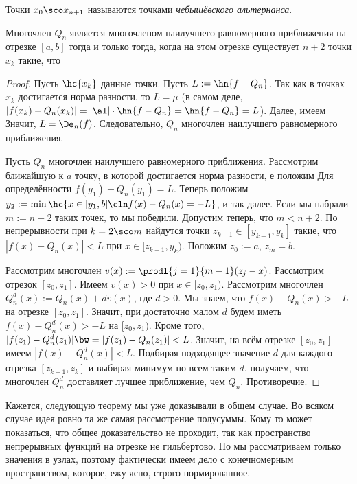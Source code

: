 \documentclass[a4paper]{article}
\begin{document}
\begin{df}
Точки $x_0\sco x_{n+1}$ называются точками \emph{чебышёвского
  альтернанса}.
\end{df}

\begin{theorem}[Чебышёв]
Многочлен $Q_n$ является многочленом наилучшего равномерного
приближения на отрезке $[a,b]$ тогда и только тогда, когда на этом
отрезке существует $n+2$ точки $x_k$ такие, что 
\end{theorem}
\begin{proof}

\framebox{$\Lar$} Пусть $\hc{x_k}$ данные точки. Пусть $L :=
\hn{f-Q_n}$. Так как в точках $x_k$ достигается норма разности, то $L
= \mu$ (в самом деле, $|f(x_k) -Q_n(x_k)| = |\al| \cdot \hn{f-Q_n} =
\hn{f-Q_n} = L$).  Далее, имеем   Значит, $L = \De_n(f)$. Следовательно, $Q_n$
многочлен наилучшего равномерного приближения.

\framebox{$\Ra$} Пусть $Q_n$ многочлен наилучшего равномерного
приближения. Рассмотрим ближайшую к $a$ точку, в которой достигается
норма разности, е положим  Для определённости $f(y_1)-Q_n(y_1) =
L$. Теперь положим $y_2 := \min\hc{x\in [y_1,b]\cln f(x)-Q_n(x) =-L}$,
и так далее. Если мы набрали $m := n+2$ таких точек, то мы победили.
Допустим теперь, что $m < n+2$. По непрерывности при $k=2\sco m$
найдутся точки $z_{k-1} \in [y_{k-1},y_k]$ такие, что $|f(x)-Q_n(x)| <
L$ при $x\in [z_{k-1},y_k)$. Положим $z_0 := a$, $z_m = b$.

Рассмотрим многочлен $v(x) := \prodl{j=1}{m-1}(z_j-x)$. Рассмотрим
отрезок $[z_0,z_1]$. Имеем $v(x) > 0$ при $x\in [z_0,z_1)$.
  Рассмотрим многочлен $Q_n^d(x) := Q_n(x)+d v(x)$, где $d > 0$. Мы
  знаем, что $f(x)-Q_n(x) > -L$ на отрезке $[z_0,z_1]$.  Значит, при
  достаточно малом $d$ будем иметь $f(x)-Q_n^d(x) > -L$ на
  $[z_0,z_1)$. Кроме того, $|f(z_1)-Q_n^d(z_1)| \bw= |f(z_1)-Q_n(z_1)|
    <L$. Значит, на всём отрезке $[z_0,z_1]$ имеем $|f(x)-Q_n^d(x)| <
    L$.  Подбирая подходящее значение $d$ для каждого отрезка
    $[z_{k-1},z_k]$ и выбирая минимум по всем таким $d$, получаем, что
    многочлен $Q_n^d$ доставляет лучшее приближение, чем
    $Q_n$. Противоречие.
\end{proof}

\begin{petit}
Кажется, следующую теорему мы уже доказывали в общем случае. Во всяком
случае идея ровно та же самая рассмотрение полусуммы.  Кому то может
показаться, что общее доказательство не проходит, так как пространство
непрерывных функций на отрезке не гильбертово.  Но мы рассматриваем
только значения в узлах, поэтому фактически имеем дело с конечномерным
пространством, которое, ежу ясно, строго нормированное.
\end{petit}
\end{document}
